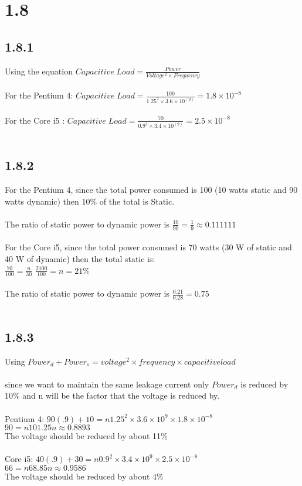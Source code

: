 \documentclass[12pt,letterpaper]{article}
\begin{document}
\section*{1.8}
\subsection*{1.8.1}
Using the equation $Capacitive\;Load = \frac{Power}{Voltage^{2}\times Frequency}$\\\\
For the Pentium 4: $Capacitive\;Load = \frac{100}{1.25^{2}\times 3.6 \times 10^(9)} = 1.8\times10^{-8}$\\\\
For the Core i5  : $Capacitive\;Load = \frac{70}{0.9^{2}\times 3.4 \times 10^(9)} = 2.5\times10^{-8}$\\\\
\subsection*{1.8.2}
For the Pentium 4, since the total power consumed is 100 (10 watts static and 90 watts dynamic) then 10\% of the total is Static.\\\\
The ratio of static power to dynamic power is $\frac{10}{90} = \frac{1}{9} \approx 0.111111$\\\\
For the Core i5, since the total power consumed is 70 watts (30 W of static and 40 W of dynamic) then the total static is:\\
$\frac{70}{100} = \frac{n}{30}$  \hspace{10mm}   $\frac{2100}{100} = n = 21\%$\\\\
The ratio of static power to dynamic power is $\frac{0.21}{0.28} = 0.75$\\\\
\subsection*{1.8.3}
Using $Power_d + Power_s = voltage^{2} \times frequency \times capacitive load$\\\\
since we want to maintain the same leakage current only $Power_d$ is reduced by 10\% and n will be the factor that the voltage is reduced by.\\\\
Pentium 4: $90(.9) + 10 = n1.25^{2} \times 3.6\times10^{9}\times1.8\times10^{-8}$\\
\indent$90 = n101.25$\indent$n\approx0.8893$\\
\indent The voltage should be reduced by about 11\%\\\\
Core i5: $40(.9) + 30 = n0.9^{2} \times 3.4\times10^{9}\times2.5\times10^{-8}$\\
\indent$66 = n68.85$\indent$n\approx0.9586$\\
\indent The voltage should be reduced by about 4\%
\end{document}
